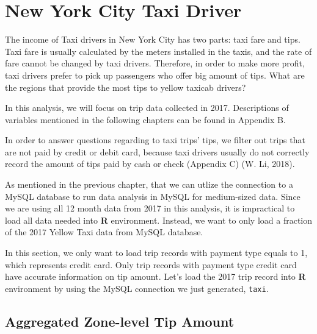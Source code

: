 \documentclass[12pt,twoside]{reedthesis}
\newenvironment{Shaded}{\begin{snugshade}}{\end{snugshade}}
\newcommand{\KeywordTok}[1]{\textcolor[rgb]{0.13,0.29,0.53}{\textbf{#1}}}
\newcommand{\DataTypeTok}[1]{\textcolor[rgb]{0.13,0.29,0.53}{#1}}
\newcommand{\DecValTok}[1]{\textcolor[rgb]{0.00,0.00,0.81}{#1}}
\newcommand{\StringTok}[1]{\textcolor[rgb]{0.31,0.60,0.02}{#1}}
\newcommand{\OtherTok}[1]{\textcolor[rgb]{0.56,0.35,0.01}{#1}}
\newcommand{\OperatorTok}[1]{\textcolor[rgb]{0.81,0.36,0.00}{\textbf{#1}}}
\newcommand{\NormalTok}[1]{#1}
\theoremstyle{definition}
\theoremstyle{definition}
\theoremstyle{definition}
\theoremstyle{remark}
\begin{document}
\chapter{New York City Taxi Driver}\label{chapter3}

The income of Taxi drivers in New York City has two parts: taxi fare and
tips. Taxi fare is usually calculated by the meters installed in the
taxis, and the rate of fare cannot be changed by taxi drivers.
Therefore, in order to make more profit, taxi drivers prefer to pick up
passengers who offer big amount of tips. What are the regions that
provide the most tips to yellow taxicab drivers?

In this analysis, we will focus on trip data collected in 2017.
Descriptions of variables mentioned in the following chapters can be
found in Appendix B.

In order to answer questions regarding to taxi trips' tips, we filter
out trips that are not paid by credit or debit card, because taxi
drivers usually do not correctly record the amount of tips paid by cash
or check (Appendix C) (W. Li, 2018).

As mentioned in the previous chapter, that we can utlize the connection
to a MySQL database to run data analysis in MySQL for medium-sized data.
Since we are using all 12 month data from 2017 in this analysis, it is
impractical to load all data needed into \textbf{R} environment.
Instead, we want to only load a fraction of the 2017 Yellow Taxi data
from MySQL database.

In this section, we only want to load trip records with payment type
equals to 1, which represents credit card. Only trip records with
payment type credit card have accurate information on tip amount. Let's
load the 2017 trip record into \textbf{R} environment by using the MySQL
connection we just generated, \texttt{taxi}.
\begin{Shaded}
\end{Shaded}
\section{Aggregated Zone-level Tip
Amount}\label{aggregated-zone-level-tip-amount}
\end{document}
